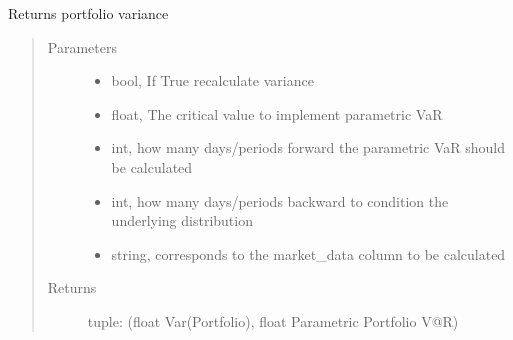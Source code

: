 \documentclass[letterpaper,10pt,english]{sphinxmanual}
\begin{document}
\begin{fulllineitems}
\begin{fulllineitems}
\label{\detokenize{securities:risk_dash.securities.Portfolio.get_port_variance}}
\sphinxAtStartPar
Returns portfolio variance
\begin{quote}\begin{description}
\item[{Parameters}] \leavevmode\begin{itemize}
\item {} 
\sphinxAtStartPar
{} \textendash{} bool, If True recalculate variance

\item {} 
\sphinxAtStartPar
{} \textendash{} float, The critical value to implement parametric VaR

\item {} 
\sphinxAtStartPar
{} \textendash{} int, how many days/periods forward the parametric VaR should be calculated

\item {} 
\sphinxAtStartPar
{} \textendash{} int, how many days/periods backward to condition the underlying distribution

\item {} 
\sphinxAtStartPar
{} \textendash{} string, corresponds to the market\_data column to be calculated

\end{itemize}

\item[{Returns}] \leavevmode
\sphinxAtStartPar
tuple: (float Var(Portfolio), float Parametric Portfolio V@R)

\end{description}\end{quote}

\end{fulllineitems}


\end{fulllineitems}
\end{document}
